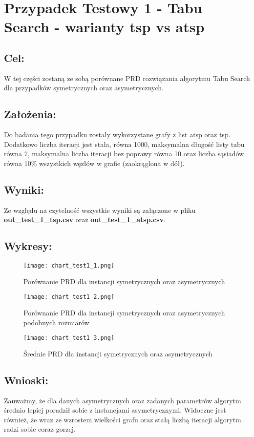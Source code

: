 \section{Przypadek Testowy 1 - Tabu Search - warianty tsp vs atsp}
  \subsection{Cel:}
    W tej części zostaną ze sobą porównane PRD rozwiązania algorytmu Tabu Search dla przypadków symetrycznych oraz asymetrycznych.
    \subsection{Założenia:}
    Do badania tego przypadku zostały wykorzystane grafy z list atsp oraz tsp. Dodatkowo liczba iteracji jest stała, równa 1000, maksymalna długość listy tabu równa 7, maksymalna liczba iteracji bez poprawy równa 10 oraz liczba sąsiadów równa 10\% wszystkich węzłów w grafie (zaokrąglona w dół).
  \subsection{Wyniki: }
    Ze względu na czytelność wszystkie wyniki są załączone w pliku \textbf{out_test_1_tsp.csv} oraz \textbf{out_test_1_atsp.csv}.
  \subsection{Wykresy: }
    \begin{figure}[H]
      \texttt{[image: chart\_test1\_1.png]}
      \centering
      \caption{Porównanie PRD dla instancji symetrycznych oraz asymetrycznych}
    \end{figure}
    \begin{figure}[H]
      \texttt{[image: chart\_test1\_2.png]}
      \centering
      \caption{Porównanie PRD dla instancji symetrycznych oraz asymetrycznych podobnych rozmiarów}
    \end{figure}
    \begin{figure}[H]
      \texttt{[image: chart\_test1\_3.png]}
      \centering
      \caption{Średnie PRD dla instancji symetrycznych oraz asymetrycznych}
    \end{figure}

  \subsection{Wnioski: }
    Zauważmy, że dla danych asymetrycznych oraz zadanych parametrów algorytm średnio lepiej poradził sobie z instancjami asymetrycznymi. Widoczne jest również, że wraz ze wzrostem wielkości grafu oraz stałą liczbą iteracji algorytm radzi sobie coraz gorzej.

